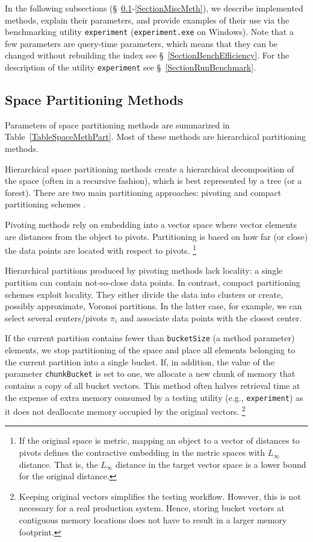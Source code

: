 \documentclass[runningheads,a4paper]{llncs}
\newcommand{\ttt}[1]{\texttt{#1}}
\begin{document}
{In the following subsections (\S~\ref{SectionSpacePartMeth}-\ref{SectionMiscMeth}),
we describe implemented methods, explain their parameters,
and provide examples of their use via the benchmarking utility \ttt{experiment} (\ttt{experiment.exe} on Windows).
Note that a few parameters are query-time parameters, which means that they 
can be changed without rebuilding the index see \S~\ref{SectionBenchEfficiency}.
For the description of the utility \ttt{experiment} see \S~\ref{SectionRunBenchmark}.

\subsection{Space Partitioning Methods} \label{SectionSpacePartMeth} 
Parameters of space partitioning methods are summarized in Table~\ref{TableSpaceMethPart}.
Most of these methods are hierarchical partitioning methods.

Hierarchical space partitioning methods create a hierarchical decomposition of the space
(often in a recursive fashion),
which is best represented by a tree (or a forest). 
There are two main partitioning approaches: 
pivoting and compact partitioning schemes  \cite{Chavez_et_al:2001a}.

Pivoting methods rely on embedding into a vector space where vector elements are distances
from the object to pivots.
Partitioning is based on how far (or close) the data points are located with respect to pivots.
\footnote{If the original space is metric, mapping an object to a vector of distances to pivots 
defines the contractive embedding in the metric spaces with $L_{\infty}$ distance.
That is, the $L_{\infty}$ distance in the target vector space is a lower bound for the original distance.}

Hierarchical partitions produced by pivoting methods lack locality: a single partition can contain
not-so-close data points. In contrast, compact partitioning schemes exploit locality.
They either divide the data into clusters or create, possibly approximate, Voronoi partitions.
In the latter case, for example, we can select several centers/pivots $\pi_i$ and associate 
data points with the closest center.

If the current partition contains fewer than \ttt{bucketSize} (a method parameter) elements,
we stop partitioning of the space and place all elements
belonging to the current partition into a single bucket. 
If, in addition, the value of the parameter \ttt{chunkBucket} is set to one,
we allocate a new chunk of memory that contains a copy of all bucket vectors.
This method often halves retrieval time
at the expense of extra memory consumed by a testing utility (e.g., \ttt{experiment}) as it does not deallocate memory occupied by the original vectors. \footnote{Keeping original vectors simplifies the testing workflow.
However, this is not necessary for a real production system.
Hence, storing bucket vectors at contiguous memory locations does not have to result in a larger memory footprint.}

}
\end{document}
